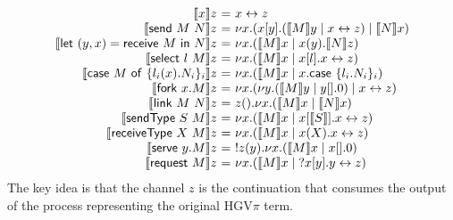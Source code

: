 \documentclass{easychair}
\makeatletter
\newcommand{\ba}{\begin{array}}
\newcommand{\ea}{\end{array}}
\newenvironment{equations}{\[\ba{@{}r@{~}c@{~}l@{}}}{\ea\]}
\newcommand{\key}{\mathsf}
\newcommand{\set}[1]{\{ #1 \}}
\newcommand{\row}[2]{\set{#1}_{#2}}
\newcommand{\gvOutputType}[2]{![{#1}].{#2}}
\newcommand{\cpj}[2]{{#1} \vdash {#2}}
\newcommand{\gvj}[3]{{#1} \vdash {#2} : {#3}}
\newcommand{\la}{l}
\newcommand{\gvLink}[2]{\key{link}~{#1}~{#2}}
\newcommand{\gvPair}[2]{({#1},{#2})}
\newcommand{\gvLet}[3]{\key{let}~{#1}={#2}~\key{in}~{#3}}
\newcommand{\gvSend}[2]{\key{send}~{#1}~{#2}}
\newcommand{\gvReceive}[1]{\key{receive}~{#1}}
\newcommand{\gvSelect}[2]{\key{select}~{#1}~{#2}}
\newcommand{\gvCase}[2]{\key{case}~{#1}~\key{of}~{#2}}
\newcommand{\gvFork}[2]{\key{fork}~{#1}.{#2}}
\newcommand{\gvReceiveK}[4]{\gvLet{\gvPair{#1}{#2}}{\gvReceive{#3}}{#4}}
\newcommand{\gvSendType}[2]{\key{sendType}~{#1}~{#2}}
\newcommand{\gvReceiveType}[2]{\key{receiveType}~{#1}~{#2}}
\newcommand{\gvServe}[2]{\key{serve}~{#1}.{#2}}
\newcommand{\gvRequest}[1]{\key{request}~{#1}}
\newcommand{\cpLink}[2]{{#1} \leftrightarrow {#2}}
\newcommand{\cpCut}[3]{\nu {#1}.({#2} \mid {#3})}
\newcommand{\cpOutput}[4]{{#1}[{#2}].({#3} \mid {#4})}
\newcommand{\cpInput}[3]{{#1}({#2}).{#3}}
\newcommand{\cpInject}[3]{{#1}[{#2}].{#3}}
\newcommand{\cpCase}[2]{{#1}.\key{case}~{#2}}
\newcommand{\cpServe}[3]{!{#1}({#2}).{#3}}
\newcommand{\cpRequest}[3]{?{#1}[{#2}].{#3}}
\newcommand{\cpEmptyOut}[1]{{#1}[].0}
\newcommand{\cpEmptyIn}[2]{{#1}().{#2}}
\newcommand{\cpSendType}[3]{{#1}[{#2}].{#3}}
\newcommand{\cpReceiveType}[3]{{#1}({#2}).{#3}}
\newcommand{\cpDual}[1]{{#1}^\bot}
\newcommand{\cpExists}[2]{\exists {#1}.{#2}}
\newcommand{\cpForall}[2]{\forall {#1}.{#2}}
\newcommand{\subst}[3]{{#1}[{#2}/{#3}]}
\newcommand{\hgvpi}{HGV$\pi$\xspace}
\newcommand{\hgvcp}[1]{\llbracket{#1}\rrbracket}
\makeatother
\begin{document}
\begin{equations}
\hgvcp{x}z &=& \cpLink{x}z \\
\hgvcp{\gvSend{M}{N}}z &=& \cpCut{x}{\cpOutput{x}{y}{\hgvcp{M}y}{\cpLink{x}{z}}}{\hgvcp{N}x} \\
\hgvcp{\gvReceiveK{y}{x}{M}{N}}z &=&
  \cpCut{x}{\hgvcp{M}x}{\cpInput{x}{y}{\hgvcp{N}z}} \\
\hgvcp{\gvSelect{\la}{M}}z &=&
  \cpCut{x}{\hgvcp{M}x}{\cpInject{x}{\la}{\cpLink{x}{z}}} \\
\hgvcp{\gvCase{M}{\row{\la_i(x).N_i}{i}}}z &=&
  \cpCut{x}{\hgvcp{M}x}{\cpCase{x}{\row{\la_i.N_i}{i}}} \\
\hgvcp{\gvFork{x}{M}}z &=&
  \cpCut{x}{\cpCut{y}{\hgvcp{M}y}{\cpEmptyOut{y}}}{\cpLink{x}{z}} \\
\hgvcp{\gvLink{M}{N}}z &=& \cpEmptyIn{z}{\cpCut{x}{\hgvcp{M}x}{\hgvcp{N}x}} \\
\hgvcp{\gvSendType{S}{M}}z &=&
  \cpCut{x}{\hgvcp{M}x}{\cpSendType{x}{\hgvcp{S}}{\cpLink{x}{z}}} \\
\hgvcp{\gvReceiveType{X}{M}}z &=&
  \cpCut{x}{\hgvcp{M}x}{\cpReceiveType{x}{X}{\cpLink{x}{z}}} \\
\hgvcp{\gvServe{y}{M}}z &=&
   \cpServe{z}{y}
      {\cpCut{x}{\hgvcp{M}x}{\cpEmptyOut{x}}} \\
\hgvcp{\gvRequest{M}}z &=& \cpCut{x}{\hgvcp{M}x}{\cpRequest{x}{y}{\cpLink{y}{z}}} \\
\end{equations}%
The key idea is that the channel $z$ is the continuation that consumes the output of the process
representing the original \hgvpi term.
%
\end{document}
